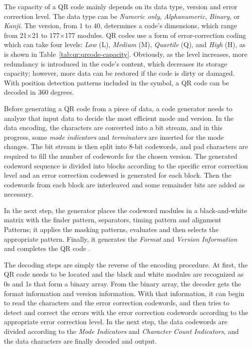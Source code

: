 The capacity of a QR code mainly depends on its data type, version and error correction level. The data type can be \emph{Numeric only},  \emph{Alphanumeric},  \emph{Binary}, or \emph{Kanji}. The version, from 1 to 40, determines a code's dimensions, which range from 21$\times$21 to 177$\times$177 modules. QR codes use a form of error-correction coding which can take four levels: \emph{Low} (L),  \emph{Medium} (M),  \emph{Quartile} (Q), and  \emph{High} (H), as is shown in Table~\ref{tab:qr:qrcode-capacity}. Obviously, as the level increases, more redundancy is introduced in the code's content, which decreases its storage capacity; however, more data can be restored if the code is dirty or damaged. With position detection patterns included in the symbol, a QR code can be decoded in 360 degrees.

Before generating a QR code from a piece of data, a code generator needs to analyze that input data to decide the most efficient mode and version. In the data encoding, the characters are converted into a bit stream, and in this progress, some \emph{mode indicators} and \emph{terminators} are inserted for the mode changes. The bit stream is then split into 8-bit codewords, and pad characters are required to fill the number of codewords for the chosen version. The generated codeword sequence is divided into blocks according to the specific error correction level and an error correction codeword is generated for each block. Then the codewords from each block are interleaved and some remainder bits are added as necessary.

In the next step, the generator places the codeword modules in a black-and-white matrix with the finder pattern, separators, timing pattern and alignment Patterns; it applies the masking patterns, evaluates and then selects the appropriate pattern. Finally, it generates the \emph{Format} and \emph{Version Information} and completes the QR code \citep{iso18004}.

The decoding steps are simply the reverse of the encoding procedure. At first, the QR code needs to be located and the black and white modules are recognized as 0s and 1s that form a binary array. From the binary array, the decoder gets the format information and version information. With that information, it can begin to read the characters and the error correction codewords, and then tries to detect and correct the errors with the error correction codewords according to the appropriate error correction level. In the next step, the data codewords are divided according to the \emph{Mode Indicators} and \emph{Character Count Indicators}, and the data characters are finally decoded and output.

